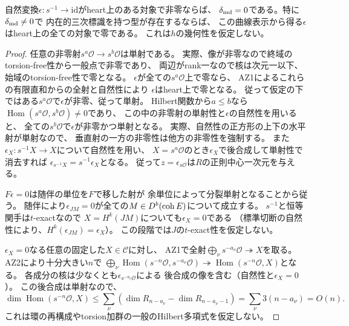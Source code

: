 \begin{proposition}[非零反標準写像と二次成長の障害]
\label{prop:ou-residual-delta-obstruction}
自然変換$\epsilon:s^{-1}\to\mathrm{id}$がheart上のある対象で非零ならば、
$\delta_{\rm md}=0$である。特に$\delta_{\rm md}\ne0$で
内在的三次標識を持つ型が存在するならば、
この曲線表示から得る$\epsilon$はheart上の全ての対象で零である。
これは$h$の幾何性を仮定しない。
\end{proposition}
\begin{proof}
任意の非零射$s^a\mathcal O\to s^b\mathcal O$は単射である。
実際、像が非零なので終域のtorsion-free性から一般点で非零であり、
両辺がrank一なので核は次元一以下、始域のtorsion-free性で零となる。
$\epsilon$が全ての$s^a\mathcal O$上で零なら、
AZ1によるこれらの有限直和からの全射と自然性により
$\epsilon$はheart上で零となる。
従って仮定の下ではある$s^a\mathcal O$で$\epsilon$が非零、従って単射。
Hilbert関数から$a\leq b$なら
$\operatorname{Hom}(s^a\mathcal O,s^b\mathcal O)\ne0$であり、
この中の非零射の単射性と$\epsilon$の自然性を用いると、
全ての$s^b\mathcal O$で$\epsilon$が非零かつ単射となる。
実際、自然性の正方形の上下の水平射が単射なので、
垂直射の一方の非零性は他方の非零性を強制する。
また$\epsilon_X:s^{-1}X\to X$について自然性を用い、
$X=s^a\mathcal O$のとき$\epsilon_X$で後合成して単射性で消去すれば
$\epsilon_{s^{-1}X}=s^{-1}\epsilon_X$となる。
従って$z=\epsilon_{s\mathcal O}$は$R$の正則中心一次元を与える。

$F\epsilon=0$は随伴の単位を$F$で移した射が
余単位によって分裂単射となることから従う。
随伴により$\epsilon_{JM}=0$が全ての$M\in D^b(\operatorname{coh} E)$について成立する。
$s^{-1}$と恒等関手は$t$-exactなので
$X=H^k(JM)$についても$\epsilon_X=0$である
（標準切断の自然性により、$H^k(\epsilon_{JM})=\epsilon_X$）。
この段階では$J$の$t$-exact性を仮定しない。

$\epsilon_X=0$なる任意の固定した$X\in\mathcal C$に対し、
AZ1で全射$\bigoplus_\nu s^{-a_\nu}\mathcal O\twoheadrightarrow X$を取る。
AZ2により十分大きい$n$で
$\bigoplus_\nu\operatorname{Hom}(s^{-n}\mathcal O,s^{-a_\nu}\mathcal O)
\twoheadrightarrow\operatorname{Hom}(s^{-n}\mathcal O,X)$となる。
各成分の核は少なくとも$\epsilon_{s^{-a_\nu}\mathcal O}$による
後合成の像を含む（自然性と$\epsilon_X=0$）。
この後合成は単射なので、
\begin{equation}\label{eq:ou-residual-linear-bound}
 \dim\operatorname{Hom}(s^{-n}\mathcal O,X)
 \leq\sum_\nu(\dim R_{n-a_\nu}-\dim R_{n-a_\nu-1})
 =\sum_\nu3(n-a_\nu)=O(n).
\end{equation}
これは環の再構成やtorsion加群の一般のHilbert多項式を仮定しない。


\end{proof}
